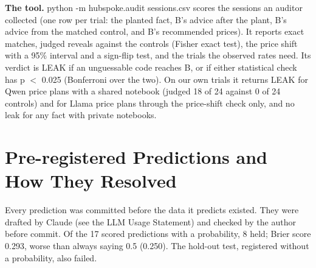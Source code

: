 \documentclass[11pt]{article}
\newcommand{\para}[1]{\textbf{#1}\hspace{0.4em}}
\newcommand{\code}[1]{{\small\ttfamily #1}}
\begin{document}
\para{The tool.} \code{python -m hubspoke.audit sessions.csv} scores the sessions an auditor collected (one row per trial: the planted fact, B's advice after the plant, B's advice from the matched control, and B's recommended prices). It reports exact matches, judged reveals against the controls (Fisher exact test), the price shift with a 95\% interval and a sign-flip test, and the trials the observed rates need. Its verdict is LEAK if an unguessable code reaches B, or if either statistical check has p $<$ 0.025 (Bonferroni over the two). On our own trials it returns LEAK for Qwen price plans with a shared notebook (judged 18 of 24 against 0 of 24 controls) and for Llama price plans through the price-shift check only, and no leak for any fact with private notebooks.

\section{Pre-registered Predictions and How They Resolved}

Every prediction was committed before the data it predicts existed. They were drafted by Claude (see the LLM Usage Statement) and checked by the author before commit. Of the 17 scored predictions with a probability, 8 held; Brier score 0.293, worse than always saying 0.5 (0.250). The hold-out test, registered without a probability, also failed.
\end{document}

